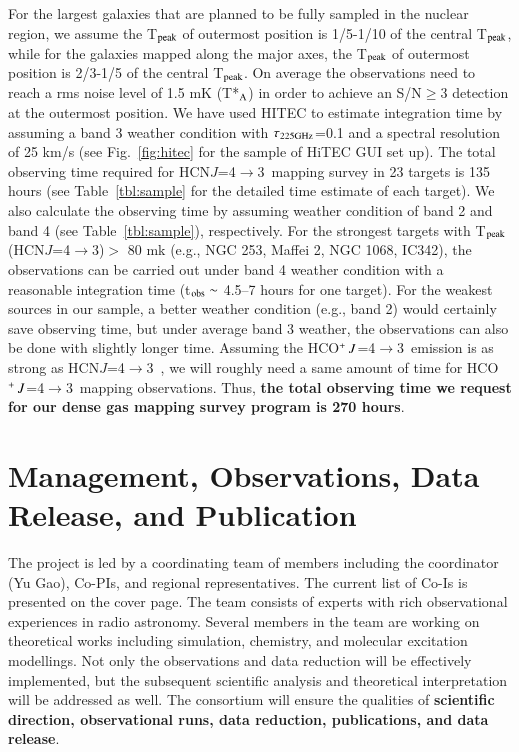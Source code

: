 \documentclass[legal,11pt]{article}
\def\,{\thinspace}
\def\HCNft        {HCN\,$J$=4$\rightarrow$3}
\def\HCOPft     {HCO$^+\,J$=4$\rightarrow$3}
\begin{document}
For the largest galaxies that are planned to be fully sampled in the nuclear
region, we assume the T$_{\rm peak}$ of outermost position is 1/5-1/10 of the
central T$_{\rm peak}$, while for the galaxies mapped along the major axes, the
T$_{\rm peak}$ of outermost position is 2/3-1/5 of the central T$_{\rm peak}$.
On average the observations need to reach a rms noise level of 1.5 mK (T*$_{\rm
A}$) in order to achieve an S/N$\geq$3 detection at the outermost position. We
have used HITEC to estimate integration time by assuming a band 3 weather
condition with $\tau_{\rm 225GHz}$=0.1 and a spectral resolution of 25 km/s
(see Fig.~\ref{fig:hitec} for the sample of HiTEC GUI set up). The total
observing time required for \HCNft\ mapping survey in 23 targets is 135 hours
(see Table~\ref{tbl:sample} for the detailed time estimate of each target).
We also calculate the observing time by assuming weather condition of
band 2 and band 4 (see Table~\ref{tbl:sample}), respectively. For the strongest
targets with T$_{\rm peak}$(\HCNft)$>$ 80 mk (e.g., NGC 253, Maffei 2, NGC
1068, IC342),  the observations can be carried out under band 4 weather
condition with a reasonable integration time (t$_{\rm obs}\sim$ 4.5--7 hours
for one target). For the weakest sources in our sample, a better weather
condition (e.g., band 2) would certainly save observing time, but under average
band 3 weather, the observations can also be done with slightly longer time.
Assuming the \HCOPft\  emission is as strong as \HCNft\ \citep[see][]{zgh2014},
we will roughly need a same amount of time for \HCOPft\ mapping observations.
Thus, {\bf the total observing time we request for our dense gas mapping survey
program is 270 hours}.



\section{Management, Observations, Data Release, and Publication } 


The project is led by a coordinating team of members including the coordinator
(Yu Gao), Co-PIs, and regional representatives. The current list of Co-Is is
presented on the cover page. The team consists of experts with rich
observational experiences in radio astronomy.  Several members in the team are
working on theoretical works including simulation, chemistry, and molecular
excitation modellings. Not only the observations and data reduction will be
effectively implemented, but the subsequent scientific analysis and theoretical
interpretation will be addressed as well.  The consortium will ensure the
qualities of {\bf scientific direction, observational runs, data reduction,
publications, and data release}. 
\end{document}
